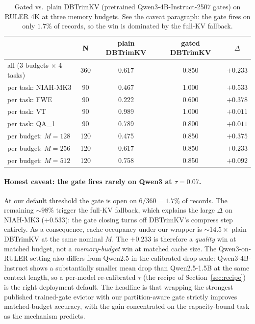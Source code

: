 \documentclass{article} %
\begin{document}
\begin{table}[h]
\centering
\caption{Gated vs.\ plain DBTrimKV (pretrained Qwen3-4B-Instruct-2507
gates) on RULER 4K at three memory budgets. See the caveat paragraph:
the gate fires on only $1.7\%$ of records, so the win is dominated by
the full-KV fallback.}
\label{tab:dbtrimkv}
\begin{tabular}{lcccc}
\toprule
 & N & plain DBTrimKV & gated DBTrimKV & $\Delta$ \\
\midrule
all (3 budgets $\times$ 4 tasks) & 360 & 0.617 & 0.850 & $\boldsymbol{+0.233}$ \\
\midrule
per task: NIAH-MK3 & 90 & 0.467 & 1.000 & $+0.533$ \\
per task: FWE      & 90 & 0.222 & 0.600 & $+0.378$ \\
per task: VT       & 90 & 0.989 & 1.000 & $+0.011$ \\
per task: QA\_1    & 90 & 0.789 & 0.800 & $+0.011$ \\
\midrule
per budget: $M=128$ & 120 & 0.475 & 0.850 & $+0.375$ \\
per budget: $M=256$ & 120 & 0.617 & 0.850 & $+0.233$ \\
per budget: $M=512$ & 120 & 0.758 & 0.850 & $+0.092$ \\
\bottomrule
\end{tabular}
\end{table}

\paragraph{Honest caveat: the gate fires rarely on Qwen3 at $\tau = 0.07$.}
At our default threshold the gate is open on $6/360 = 1.7\%$ of
records. The remaining $\sim 98\%$ trigger the full-KV fallback, which
explains the large $\Delta$ on NIAH-MK3 ($+0.533$): the gate closing
turns off DBTrimKV's compress step entirely. As a consequence, cache
occupancy under our wrapper is $\sim 14.5 \times$ plain DBTrimKV at the
same nominal $M$. The $+0.233$ is therefore a \emph{quality} win at
matched budget, not a \emph{memory-budget} win at matched cache size.
The Qwen3-on-RULER setting also differs from Qwen2.5 in the calibrated
drop scale: Qwen3-4B-Instruct shows a substantially smaller mean drop
than Qwen2.5-1.5B at the same context length, so a per-model
re-calibrated $\tau$ (the recipe of Section~\ref{sec:recipe}) is the
right deployment default. The headline is that wrapping the strongest
published trained-gate evictor with our partition-aware gate
strictly improves matched-budget accuracy, with the gain concentrated
on the capacity-bound task as the mechanism predicts.
\end{document}
